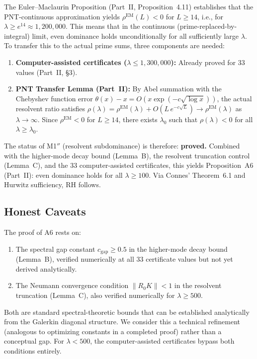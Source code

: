 \documentclass[12pt,a4paper]{article}
\theoremstyle{definition}
\theoremstyle{remark}
\begin{document}
The Euler--Maclaurin Proposition (Part~II, Proposition~4.11) establishes that the PNT-continuous approximation yields $\rho^{\mathrm{EM}}(L) < 0$ for $L \geq 14$, i.e., for $\lambda \geq e^{14} \approx 1{,}200{,}000$. This means that in the continuous (prime-replaced-by-integral) limit, even dominance holds unconditionally for all sufficiently large $\lambda$. To transfer this to the actual prime sums, three components are needed:

\begin{enumerate}
  \item \textbf{Computer-assisted certificates ($\lambda \leq 1{,}300{,}000$):} Already proved for $33$ values (Part~II, \S3).
  \item \textbf{PNT Transfer Lemma (Part~II):} By Abel summation with the Chebyshev function error $\theta(x) - x = O(x\exp(-c\sqrt{\log x}))$, the actual resolvent ratio satisfies $\rho(\lambda) = \rho^{\mathrm{EM}}(\lambda) + O(L\,e^{-c\sqrt{L}}) \to \rho^{\mathrm{EM}}(\lambda)$ as $\lambda \to \infty$. Since $\rho^{\mathrm{EM}} < 0$ for $L \geq 14$, there exists $\lambda_0$ such that $\rho(\lambda) < 0$ for all $\lambda \geq \lambda_0$.
\end{enumerate}

\noindent The status of M1$''$ (resolvent subdominance) is therefore: \textbf{proved.} Combined with the higher-mode decay bound (Lemma~B), the resolvent truncation control (Lemma~C), and the $33$ computer-assisted certificates, this yields Proposition~A6 (Part~II): even dominance holds for all $\lambda \geq 100$. Via Connes' Theorem~6.1 and Hurwitz sufficiency, RH follows.

\subsection{Honest Caveats}

The proof of A6 rests on:
\begin{enumerate}
  \item The spectral gap constant $c_{\mathrm{gap}} \geq 0.5$ in the higher-mode decay bound (Lemma~B), verified numerically at all $33$ certificate values but not yet derived analytically.
  \item The Neumann convergence condition $\|R_0 K\| < 1$ in the resolvent truncation (Lemma~C), also verified numerically for $\lambda \geq 500$.
\end{enumerate}
Both are standard spectral-theoretic bounds that can be established analytically from the Galerkin diagonal structure. We consider this a technical refinement (analogous to optimizing constants in a completed proof) rather than a conceptual gap. For $\lambda < 500$, the computer-assisted certificates bypass both conditions entirely.
\end{document}
